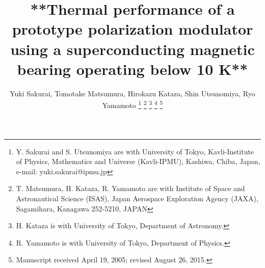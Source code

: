 \documentclass[journal]{IEEEtran}
\begin{document}
%
\title{**Thermal performance of a prototype polarization modulator using a superconducting magnetic bearing operating below 10 K**}
%
%
%

\author{Yuki Sakurai, Tomotake Matsumura, Hirokazu Kataza, Shin Utsunomiya, Ryo Yamamoto
\thanks{Y. Sakurai and S. Utsunomiya are with University of Tokyo, Kavli-Institute of Physics, Mathematics and Universe (Kavli-IPMU), Kashiwa, Chiba, Japan, e-mail: yuki.sakurai@ipmu.jp}
\thanks{T. Matsumura, H. Kataza, R. Yamamoto are with Institute of Space and Astronautical Science (ISAS), Japan Aerospace Exploration Agency (JAXA), Sagamihara, Kanagawa 252-5210, JAPAN}
\thanks{H. Kataza is with University of Tokyo, Department of Astronomy.}
\thanks{R. Yamamoto is with University of Tokyo, Department of Physics.}
\thanks{Manuscript received April 19, 2005; revised August 26, 2015.}}

%
%
\end{document}
